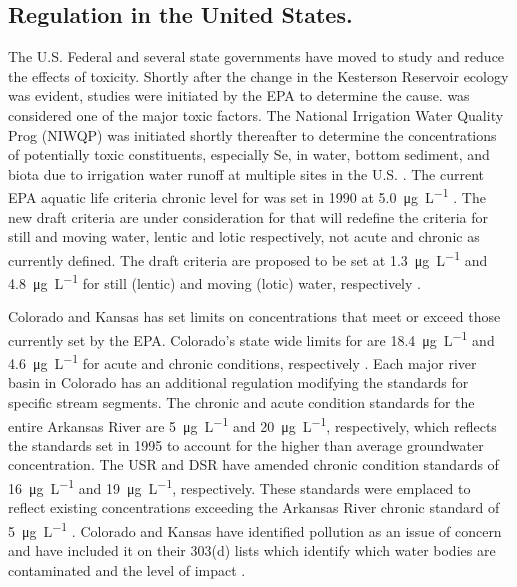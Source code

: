 \begin{linenumbers}[1]
\subsection*{\Se Regulation in the United States.}
The U.S. Federal and several state governments have moved to study and reduce the effects of \Se toxicity.  Shortly after the change in the Kesterson Reservoir ecology was evident, studies were initiated by the EPA to determine the cause.  \Se was considered one of the major toxic factors.  The National Irrigation Water Quality Prog (NIWQP) was initiated shortly thereafter to determine the concentrations of potentially toxic constituents, especially Se, in water, bottom sediment, and biota due to irrigation water runoff at multiple sites in the U.S. \parencite{Hamilton1999}.  The current EPA aquatic life criteria chronic level for \Se was set in 1990 at \SI{5.0}{\micro\g\per\liter} \parencite{EPA-Se}.  The new draft criteria are under consideration for \Se that will redefine the criteria for still and moving water, lentic and lotic respectively, not acute and chronic as currently defined.  The draft criteria are proposed to be set at \SI{1.3}{\micro\g\per\liter} and \SI{4.8}{\micro\g\per\liter} for still (lentic) and moving (lotic) water, respectively \parencite{2014USEPA,Hamilton1999,EPA-Se}.

Colorado and Kansas has set limits on \Se concentrations that meet or exceed those currently set by the EPA.  Colorado's state wide limits for \Se are \SI{18.4}{\micro\g\per\liter} and \SI{4.6}{\micro\g\per\liter} for acute and chronic conditions, respectively \parencite{5CCR1002-31}.  Each major river basin in Colorado has an additional regulation modifying the standards for specific stream segments.  The chronic and acute condition standards for the entire Arkansas River are \SI{5}{\micro\g\per\liter} and \SI{20}{\micro\g\per\liter}, respectively, which reflects the standards set in 1995 to account for the higher than average groundwater \Se concentration.  The USR and DSR have amended chronic condition standards of \SI{16}{\micro\g\per\liter} and \SI{19}{\micro\g\per\liter}, respectively.  These standards were emplaced to reflect existing \Se concentrations exceeding the Arkansas River chronic standard of \SI{5}{\micro\g\per\liter} \parencite{5CCR1002-32}.  Colorado and Kansas have identified \Se pollution as an issue of concern and have included it on their 303(d) lists which identify which water bodies are contaminated and the level of impact \parencite{5CCR1002-93,2014Kansas303d}.


\end{linenumbers}
